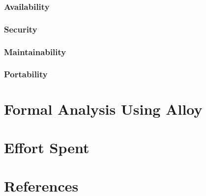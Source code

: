 \documentclass[a4paper]{article}
\begin{document}
\subsubsection{Availability}

\subsubsection{Security}

\subsubsection{Maintainability}

\subsubsection{Portability}

\section{Formal Analysis Using Alloy}

\section{Effort Spent}

\section{References}
\end{document}
